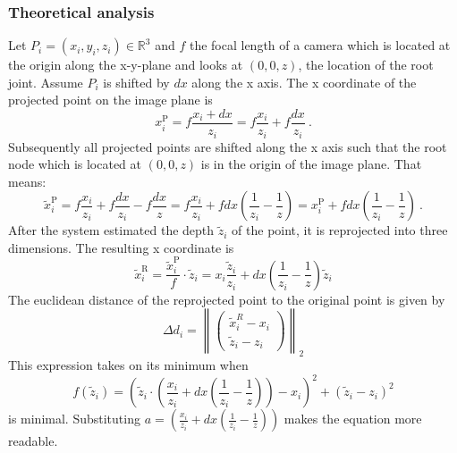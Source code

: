 \subsubsection{Theoretical analysis}
Let $P_i=(x_i, y_i, z_i) \in \mathbb{R}^3$ and $f$ the focal length of a camera which is located at the origin along the x-y-plane and looks at $(0, 0, z)$, the location of the root joint. 
Assume $P_i$ is shifted by $dx$ along the x axis.
The x coordinate of the projected point on the image plane is
\begin{equation}
	x_i^\mathrm{P} = f \frac{x_i + dx}{z_i} = f \frac{x_i}{z_i} + f \frac{dx}{z_i}\ .
\end{equation}
Subsequently all projected points are shifted along the x axis such that the root node which is located at $(0, 0, z)$ is in the origin of the image plane. That means:
\begin{equation}
	\widetilde{x}_i^\mathrm{P} = f \frac{x_i}{z_i} + f \frac{dx}{z_i} - f \frac{dx}{z} 
	= f \frac{x_i}{z_i} + f dx (\frac{1}{z_i} - \frac{1}{z})
	= x_i^\mathrm{P} + f dx (\frac{1}{z_i} - \frac{1}{z})\ .
\end{equation}
After the system estimated the depth $\widetilde{z}_i$ of the point, it is reprojected into three dimensions. The resulting x coordinate is 
\begin{equation}
	\widetilde{x}_i^\mathrm{R} = \frac{\widetilde{x}_i^\mathrm{P}}{f} \cdot \widetilde{z}_i
	= x_i \frac{\widetilde{z}_i}{z_i} + dx (\frac{1}{z_i} - \frac{1}{z}) \widetilde{z}_i
\end{equation}
The euclidean distance of the reprojected point to the original point is given by
\begin{equation}
\label{eq:delta-d}
	\Delta d_i = \left \| 
	\begin{pmatrix}
		\widetilde{x}_i^R - x_i \\
		\widetilde{z}_i - z_i
	\end{pmatrix}
	\right \|_2
\end{equation}
This expression takes on its minimum when 
\begin{equation}
	\label{eq:minimum-distance}
	f(\widetilde{z}_i) = \left ( \widetilde{z}_i \cdot \left( \frac{x_i}{z_i} + dx \left( \frac{1}{z_i} - \frac{1}{z} \right) \right ) - x_i \right)^2 + ( \widetilde{z}_i - z_i ) ^2
\end{equation}
is minimal. 
Substituting $a = \left( \frac{x_i}{z_i} + dx \left( \frac{1}{z_i} - \frac{1}{z} \right) \right )$ makes the equation more readable. 
